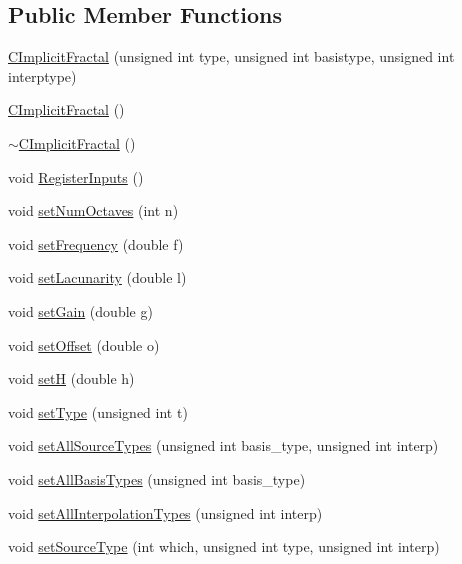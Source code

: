 \subsection*{Public Member Functions}
\begin{DoxyCompactItemize}
\item 
\hyperlink{classanl_1_1CImplicitFractal_afab4a315bfddf5a9a5ad81a10c4bc0ad}{CImplicitFractal} (unsigned int type, unsigned int basistype, unsigned int interptype)
\item 
\hyperlink{classanl_1_1CImplicitFractal_adaede5debbc4f0e33d2d45b5c48b73e0}{CImplicitFractal} ()
\item 
\hyperlink{classanl_1_1CImplicitFractal_ac85e41108505f6e634547533fe90b9ec}{$\sim$CImplicitFractal} ()
\item 
void \hyperlink{classanl_1_1CImplicitFractal_acb99fcb86b011de2d456e7a9717ddc6a}{RegisterInputs} ()
\item 
void \hyperlink{classanl_1_1CImplicitFractal_aede657ee45d7798ec02e96c42be0bddd}{setNumOctaves} (int n)
\item 
void \hyperlink{classanl_1_1CImplicitFractal_a43e02702d75a1a182b5aad7570cbb402}{setFrequency} (double f)
\item 
void \hyperlink{classanl_1_1CImplicitFractal_a71af152ba6b71d07ac0ed98eb23e2a08}{setLacunarity} (double l)
\item 
void \hyperlink{classanl_1_1CImplicitFractal_adaa9dd87e175912a655a635c76285e16}{setGain} (double g)
\item 
void \hyperlink{classanl_1_1CImplicitFractal_a744a3ba1497e1f36c765376193bbb672}{setOffset} (double o)
\item 
void \hyperlink{classanl_1_1CImplicitFractal_a4f17450c6b9b668d5bb58bb15275e7a5}{setH} (double h)
\item 
void \hyperlink{classanl_1_1CImplicitFractal_a8c2950c653a22ea6e1604328012dce9d}{setType} (unsigned int t)
\item 
void \hyperlink{classanl_1_1CImplicitFractal_a10de2f1eb07f25e45276891e04b1a153}{setAllSourceTypes} (unsigned int basis\_\-type, unsigned int interp)
\item 
void \hyperlink{classanl_1_1CImplicitFractal_a0179d7428b6ee61a87cdd2ffa012d5cc}{setAllBasisTypes} (unsigned int basis\_\-type)
\item 
void \hyperlink{classanl_1_1CImplicitFractal_a1c3c79a50223078d20f88aa31a99c8cc}{setAllInterpolationTypes} (unsigned int interp)
\item 
void \hyperlink{classanl_1_1CImplicitFractal_a29e4aaa3356b9782aa44388023d46d63}{setSourceType} (int which, unsigned int type, unsigned int interp)

\end{DoxyCompactItemize}
